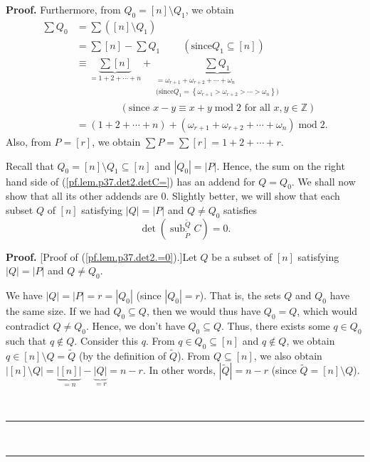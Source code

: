 \documentclass[numbers=enddot,12pt,final,onecolumn,notitlepage]{scrartcl}%
\theoremstyle{definition}
\newenvironment{proof}[1][Proof]{\noindent\textbf{#1.} }{\ \rule{0.5em}{0.5em}}
\let\sumnonlimits\sum
\renewcommand{\sum}{\sumnonlimits\limits}
\begin{document}
\begin{enumerate}
\begin{proof}
Furthermore, from $Q_{0}=\left[  n\right]  \setminus Q_{1}$, we obtain%
\begin{align*}
\sum Q_{0}  &  =\sum\left(  \left[  n\right]  \setminus Q_{1}\right) \\
&  =\sum\left[  n\right]  -\sum Q_{1}\ \ \ \ \ \ \ \ \ \ \left(  \text{since
}Q_{1}\subseteq\left[  n\right]  \right) \\
&  \equiv\underbrace{\sum\left[  n\right]  }_{=1+2+\cdots+n}+\underbrace{\sum
Q_{1}}_{\substack{=\omega_{r+1}+\omega_{r+2}+\cdots+\omega_{n}\\\text{(since
}Q_{1}=\left\{  \omega_{r+1}>\omega_{r+2}>\cdots>\omega_{n}\right\}  \text{)}%
}}\\
&  \ \ \ \ \ \ \ \ \ \ \ \ \ \ \ \ \ \ \ \ \left(  \text{since }x-y\equiv
x+y\operatorname{mod}2\text{ for all }x,y\in\mathbb{Z}\right) \\
&  =\left(  1+2+\cdots+n\right)  +\left(  \omega_{r+1}+\omega_{r+2}%
+\cdots+\omega_{n}\right)  \operatorname{mod}2.
\end{align*}
Also, from $P=\left[  r\right]  $, we obtain $\sum P=\sum\left[  r\right]
=1+2+\cdots+r$.

Recall that $Q_{0}=\left[  n\right]  \setminus Q_{1}\subseteq\left[  n\right]
$ and $\left\vert Q_{0}\right\vert =\left\vert P\right\vert $. Hence, the sum
on the right hand side of (\ref{pf.lem.p37.det2.detC=}) has an addend for
$Q=Q_{0}$. We shall now show that all its other addends are $0$. Slightly
better, we will show that each subset $Q$ of $\left[  n\right]  $ satisfying
$\left\vert Q\right\vert =\left\vert P\right\vert $ and $Q\neq Q_{0}$
satisfies%
\begin{equation}
\det\left(  \operatorname*{sub}\nolimits_{\widetilde{P}}^{\widetilde{Q}%
}C\right)  =0. \label{pf.lem.p37.det2.=0}%
\end{equation}


\begin{proof}
[Proof of (\ref{pf.lem.p37.det2.=0}).]Let $Q$ be a subset of $\left[
n\right]  $ satisfying $\left\vert Q\right\vert =\left\vert P\right\vert $ and
$Q\neq Q_{0}$.

We have $\left\vert Q\right\vert =\left\vert P\right\vert =r=\left\vert
Q_{0}\right\vert $ (since $\left\vert Q_{0}\right\vert =r$). That is, the sets
$Q$ and $Q_{0}$ have the same size. If we had $Q_{0}\subseteq Q$, then we
would thus have $Q_{0}=Q$, which would contradict $Q\neq Q_{0}$. Hence, we
don't have $Q_{0}\subseteq Q$. Thus, there exists some $q\in Q_{0}$ such that
$q\notin Q$. Consider this $q$. From $q\in Q_{0}\subseteq\left[  n\right]  $
and $q\notin Q$, we obtain $q\in\left[  n\right]  \setminus Q=\widetilde{Q}$
(by the definition of $\widetilde{Q}$). From $Q\subseteq\left[  n\right]  $,
we also obtain $\left\vert \left[  n\right]  \setminus Q\right\vert
=\underbrace{\left\vert \left[  n\right]  \right\vert }_{=n}%
-\underbrace{\left\vert Q\right\vert }_{=r}=n-r$. In other words, $\left\vert
\widetilde{Q}\right\vert =n-r$ (since $\widetilde{Q}=\left[  n\right]
\setminus Q$).


\end{proof}
\end{proof}
\end{enumerate}
\end{document}
